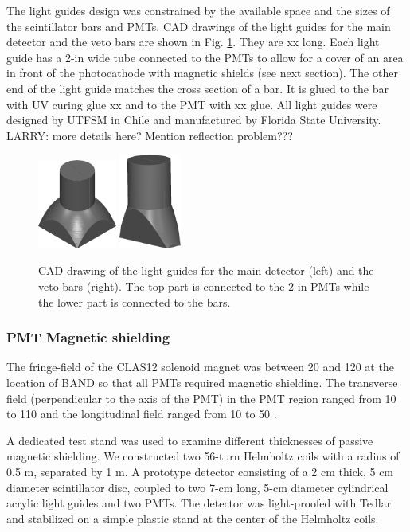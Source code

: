 \documentclass[3p,final,twocolumn]{elsarticle}
\begin{document}
The light guides design was constrained by the available space and the
sizes of the scintillator bars and PMTs. CAD drawings of the light guides for the main detector and the veto bars are shown in Fig. \ref{fig:lightguides}. They are xx long. Each light guide has a 2-in wide tube connected to the PMTs to allow for a cover of an area in front of the photocathode with magnetic shields (see next section). The other end of the light guide matches the cross section of a bar. It is glued to the bar with UV curing glue xx and to the PMT with xx glue. All light guides were designed by UTFSM in Chile and manufactured by Florida State University.  
{\color{red} LARRY: more details here? Mention reflection problem???}
\begin{figure}[tb]
	\centering
	\includegraphics[width=0.23\textwidth]{bar_lg.png}
		\includegraphics[width=0.18\textwidth]{veto_lg.png}
	\caption{CAD drawing of the light guides for the main detector (left) and the veto bars (right). The top part is connected to the 2-in PMTs while the lower part is connected to the bars.}
	\label{fig:lightguides}
\end{figure}

\subsubsection{PMT Magnetic shielding}
The fringe-field of the CLAS12 solenoid magnet
\cite{Fair:2020yfx} was between 20 and 120 \si{\gauss} at the location of
BAND so that all PMTs required magnetic shielding. The transverse
field (perpendicular to the axis of the PMT) in the PMT region ranged from 10 to
  110 \si{\gauss} and the longitudinal field ranged from 10 to 50 \si{\gauss}.

  A dedicated test stand was used to examine different thicknesses of
  passive magnetic shielding.  We constructed two 56-turn Helmholtz
  coils with a radius of 0.5 \si{\meter}, separated by 1 \si{\meter}. A
  prototype detector consisting of a 2 \si{\centi\meter} thick, 5
  \si{\centi\meter} diameter scintillator disc, coupled to two
  7-\si{\centi\meter} long, 5-\si{\centi\meter} diameter cylindrical
  acrylic light guides and two PMTs. The detector was
  light-proofed with Tedlar and stabilized on a simple plastic stand
  at the center of the Helmholtz coils.
\end{document}
